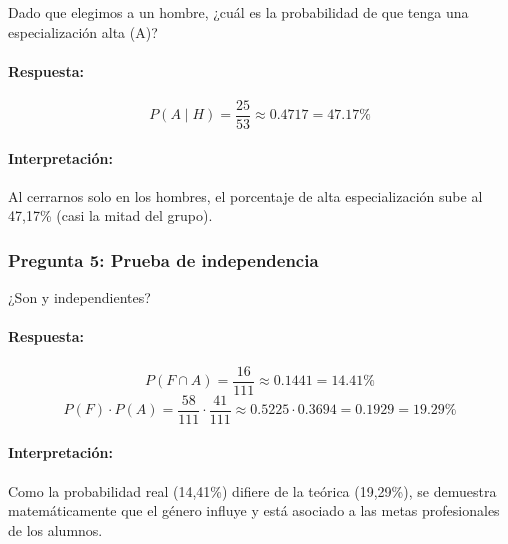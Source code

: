 Dado que elegimos a un hombre, ¿cuál es la probabilidad de que tenga una especialización alta (A)?

\paragraph{Respuesta:} 
\[ P(A \mid H) = \frac{25}{53} \approx 0.4717 = 47.17\% \]

\paragraph{Interpretación:} Al cerrarnos solo en los hombres, el porcentaje de alta especialización
sube al 47,17\% (casi la mitad del grupo).


\subsubsection{Pregunta 5: Prueba de independencia}

¿Son  y  independientes?

\paragraph{Respuesta:} 
\[ P(F \cap A) = \frac{16}{111} \approx 0.1441 = 14.41\% \]
\[ P(F) \cdot P(A) = \frac{58}{111} \cdot \frac{41}{111} \approx 0.5225 \cdot 0.3694 = 0.1929 = 19.29\% \]

\paragraph{Interpretación:} Como la probabilidad real (14,41\%) difiere de la teórica (19,29\%), se
demuestra matemáticamente que el género influye y está asociado a las metas profesionales de los
alumnos.
